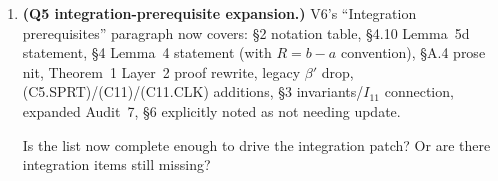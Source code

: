 \documentclass{article}
\begin{document}
\begin{enumerate}
  Is the sign-direction discipline now correct end-to-end?  Are
  there other places in the proof where sign-direction issues
  could lurk (e.g., in the post-clipping drift verification, or
  in the relationship between raw KL floor and clipped drift)?

\item \textbf{(Q5 integration-prerequisite expansion.)}  V6's
  ``Integration prerequisites'' paragraph now covers: §2 notation
  table, §4.10 Lemma~5d statement, §4 Lemma~4 statement (with
  $R = b - a$ convention), §A.4 prose nit, Theorem~1 Layer~2 proof
  rewrite, legacy $\beta'$ drop, (C5.SPRT)/(C11)/(C11.CLK)
  additions, §3 invariants/$I_{11}$ connection, expanded Audit~7,
  §6 explicitly noted as not needing update.

  Is the list now complete enough to drive the integration patch?
  Or are there integration items still missing?
\end{enumerate}
\end{document}
